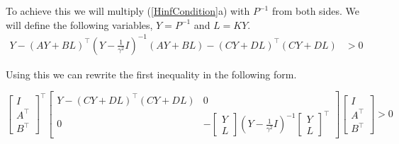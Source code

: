 To achieve this we will multiply (\ref{HinfCondition}a) with $P^{-1}$ from both sides. We will define the following variables, $Y = P^{-1}$ and $L = KY$.
\begin{align*}
	Y - (AY + BL)^\top (Y - \frac{1}{\gamma^2} I )^{-1} (AY + BL) - (CY + DL)^\top (CY + DL) &> 0
\end{align*}

Using this we can rewrite the first inequality in the following form.

\begin{equation*}
	\left[\begin{array}{c}
		I \\ \hline A^\top \\ B^\top
	\end{array}\right]^\top
	\left[\begin{array}{c|c}
		Y - (CY + DL)^\top (CY + DL) & 0 \\ \hline
		0 & -\begin{bmatrix} Y\\ L \end{bmatrix} \left(Y - \frac{1}{\gamma^2}I\right)^{-1} \begin{bmatrix} Y \\ L \end{bmatrix}^\top
	\end{array}\right]
	\left[\begin{array}{c}
		I \\ \hline A^\top \\ B^\top
	\end{array}\right] > 0
\end{equation*}

